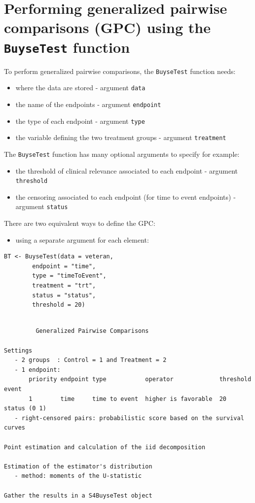 \documentclass[12pt]{article}
\begin{document}
\clearpage

\section{Performing generalized pairwise comparisons (GPC) using the \texttt{BuyseTest} function}
\label{sec:org49eab25}

To perform generalized pairwise comparisons, the \texttt{BuyseTest} function needs:
\begin{itemize}
\item where the data are stored \hfill - argument \texttt{data}
\item the name of the endpoints \hfill - argument \texttt{endpoint}
\item the type of each endpoint \hfill - argument \texttt{type}
\item the variable defining the two treatment groups \hfill - argument
\texttt{treatment}
\end{itemize}
The \texttt{BuyseTest} function has many optional arguments to specify for example:
\begin{itemize}
\item the threshold of clinical relevance associated to each endpoint \hfill - argument \texttt{threshold}
\item the censoring associated to each endpoint (for time to event endpoints) \hfill - argument \texttt{status}
\end{itemize}

\bigskip

There are two equivalent ways to define the GPC: 
\begin{itemize}
\item using a separate argument for each element:
\end{itemize}

\lstset{language=r,label= ,caption= ,captionpos=b,numbers=none}
\begin{lstlisting}
BT <- BuyseTest(data = veteran, 
		endpoint = "time", 
		type = "timeToEvent", 
		treatment = "trt", 
		status = "status", 
		threshold = 20)
\end{lstlisting}

\begin{verbatim}

         Generalized Pairwise Comparisons

Settings 
   - 2 groups  : Control = 1 and Treatment = 2
   - 1 endpoint: 
       priority endpoint type           operator             threshold event       
       1        time     time to event  higher is favorable  20        status (0 1)
   - right-censored pairs: probabilistic score based on the survival curves 

Point estimation and calculation of the iid decomposition

Estimation of the estimator's distribution 
   - method: moments of the U-statistic

Gather the results in a S4BuyseTest object
\end{verbatim}
\end{document}
